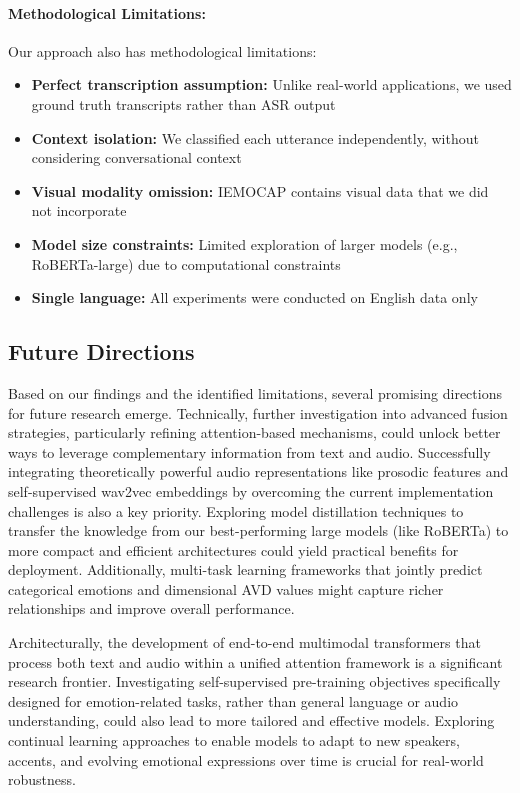\documentclass[12pt]{article}
\begin{document}
\paragraph{Methodological Limitations:}
Our approach also has methodological limitations:

\begin{itemize}
    \item \textbf{Perfect transcription assumption:} Unlike real-world applications, we used ground truth transcripts rather than ASR output
    
    \item \textbf{Context isolation:} We classified each utterance independently, without considering conversational context
    
    \item \textbf{Visual modality omission:} IEMOCAP contains visual data that we did not incorporate
    
    \item \textbf{Model size constraints:} Limited exploration of larger models (e.g., RoBERTa-large) due to computational constraints
    
    \item \textbf{Single language:} All experiments were conducted on English data only
\end{itemize}

\subsection{Future Directions}
Based on our findings and the identified limitations, several promising directions for future research emerge. Technically, further investigation into advanced fusion strategies, particularly refining attention-based mechanisms, could unlock better ways to leverage complementary information from text and audio. Successfully integrating theoretically powerful audio representations like prosodic features and self-supervised wav2vec embeddings by overcoming the current implementation challenges is also a key priority. Exploring model distillation techniques to transfer the knowledge from our best-performing large models (like RoBERTa) to more compact and efficient architectures could yield practical benefits for deployment. Additionally, multi-task learning frameworks that jointly predict categorical emotions and dimensional AVD values might capture richer relationships and improve overall performance.

Architecturally, the development of end-to-end multimodal transformers that process both text and audio within a unified attention framework is a significant research frontier. Investigating self-supervised pre-training objectives specifically designed for emotion-related tasks, rather than general language or audio understanding, could also lead to more tailored and effective models. Exploring continual learning approaches to enable models to adapt to new speakers, accents, and evolving emotional expressions over time is crucial for real-world robustness.
\end{document}
